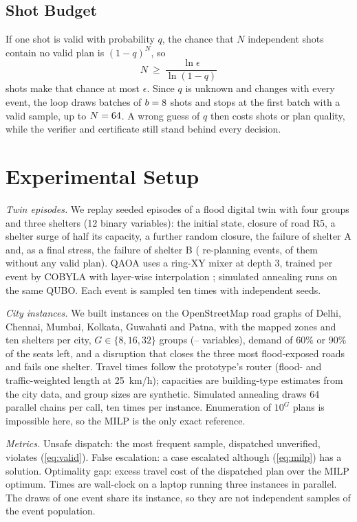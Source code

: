 \documentclass[conference]{IEEEtran}
\begin{document}
\subsection{Shot Budget}
If one shot is valid with probability $q$, the chance that $N$ independent shots contain no valid plan is $(1-q)^N$, so
\begin{equation}
N\ \ge\ \frac{\ln\epsilon}{\ln(1-q)}
\label{eq:shots}
\end{equation}
shots make that chance at most $\epsilon$. Since $q$ is unknown and changes with every event, the loop draws batches of $b=8$ shots and stops at the first batch with a valid sample, up to $N=64$. A wrong guess of $q$ then costs shots or plan quality, while the verifier and certificate still stand behind every decision.

\section{Experimental Setup}
\textit{Twin episodes.} We replay \TwinSeeds{} seeded episodes of a flood digital twin with four groups and three shelters (12 binary variables): the initial state, closure of road R5, a shelter surge of half its capacity, a further random closure, the failure of shelter A and, as a final stress, the failure of shelter B (\TwinEvents{} re-planning events, \TwinInfeasible{} of them without any valid plan). QAOA uses a ring-XY mixer at depth 3, trained per event by COBYLA with layer-wise interpolation \cite{Zhou2020}; simulated annealing runs on the same QUBO. Each event is sampled ten times with independent seeds.

\textit{City instances.} We built \CityN{} instances on the OpenStreetMap road graphs of Delhi, Chennai, Mumbai, Kolkata, Guwahati and Patna, with the mapped zones and ten shelters per city, $G\in\{8,16,32\}$ groups (\CityMinVars--\CityMaxVars{} variables), demand of 60\% or 90\% of the seats left, and a disruption that closes the three most flood-exposed roads and fails one shelter. Travel times follow the prototype's router (flood- and traffic-weighted length at 25~km/h); capacities are building-type estimates from the city data, and group sizes are synthetic. Simulated annealing draws 64 parallel chains per call, ten times per instance. Enumeration of $10^{G}$ plans is impossible here, so the MILP is the only exact reference.

\textit{Metrics.} Unsafe dispatch: the most frequent sample, dispatched unverified, violates (\ref{eq:valid}). False escalation: a case escalated although (\ref{eq:milp}) has a solution. Optimality gap: excess travel cost of the dispatched plan over the MILP optimum. Times are wall-clock on a laptop running three instances in parallel. The draws of one event share its instance, so they are not independent samples of the event population.
\end{document}
